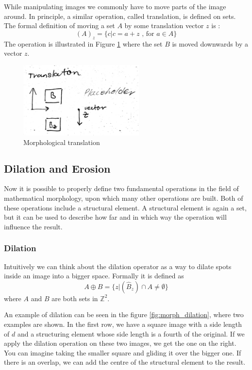 \documentclass[
  digital,     %
  oneside,     %
  nosansbold,  %
  nocolorbold, %
  lof,         %
  lot,         %
]{fithesis4}
\newcommand*{\Z}{\ensuremath{\mathbb{Z}}}
\begin{document}
While manipulating images we commonly have to move parts of the image around.  In principle, a similar operation, called translation, is defined on sets. The formal definition of
moving a set $A$ by some translation vector $z$ is \parencite{gonzalez2002}:
$$(A)_z = \{c | c = a + z\text{ , for } a \in A\}$$
The operation is illustrated in Figure \ref{fig:morph_translation} where the set
$B$ is moved downwards by a vector $z$.
\begin{figure}
    \begin{center}
        \includegraphics[width=6.3cm]{resources/morph_translation.jpg}
    \end{center}
    \caption{Morphological translation} %
    \label{fig:morph_translation}
\end{figure}

\subsection{Dilation and Erosion}
Now it is possible to properly define two fundamental operations in the field of mathematical morphology, upon which many other operations are built. Both of
these operations include a structural element. A structural element is again a
set, but it can be used to describe how far and in which way the operation will influence the result.


\subsubsection{Dilation}
Intuitively we can think about the dilation
operator as a way to dilate spots inside an image into a bigger space. Formally it is defined
as \parencite{gonzalez2002}
$$A \oplus B = \{z | (\hat{B}_z) \cap A \neq \emptyset\}$$
where $A$ and $B$ are both sets in $\Z^2$.

An example of dilation can be seen in the figure
\ref{fig:morph_dilation}, where two examples are shown. In the first row, we have
a square image with a side length of $d$ and a structuring element whose side length
is a fourth of the original. If we apply the dilation operation on these two
images, we get the one on the right. You can imagine taking the smaller square and
gliding it over the bigger one. If there is an overlap, we can add the centre of
the structural element to the result.
\end{document}
